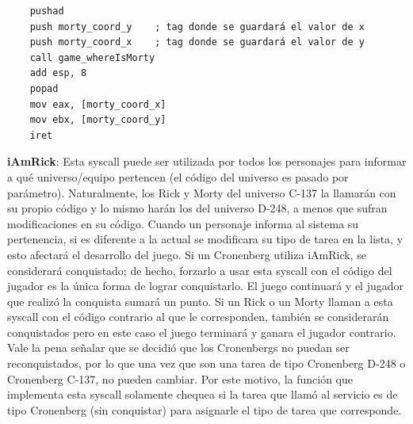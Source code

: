 \documentclass[a4paper]{article}
\newenvironment{codesnippet}{%
	\begin{Sbox}\begin{minipage}{\textwidth}\sffamily\small}%
	{\end{minipage}\end{Sbox}%
		\begin{center}%
		\vspace{-0.4cm}\colorbox{litegrey}{\TheSbox}\end{center}\vspace{0.3cm}}
\begin{document}
\begin{codesnippet}
\begin{verbatim}
    pushad 
    push morty_coord_y    ; tag donde se guardará el valor de x
    push morty_coord_x    ; tag donde se guardará el valor de y
    call game_whereIsMorty
    add esp, 8
    popad
    mov eax, [morty_coord_x]
    mov ebx, [morty_coord_y]
    iret
\end{verbatim}
\end{codesnippet}

\textbf{iAmRick}:
Esta syscall puede ser utilizada por todos los personajes para informar a qué universo/equipo pertencen (el código del universo es pasado por parámetro). Naturalmente, los Rick y Morty del universo C-137 la llamarán con su propio código y lo mismo harán los del universo D-248, a menos que sufran modificaciones en su código. Cuando un personaje informa al sistema su pertenencia, si es diferente a la actual se modificara su tipo de tarea en la lista, y esto afectará el desarrollo del juego. Si un Cronenberg utiliza iAmRick, se considerará conquistado; de hecho, forzarlo a usar esta syscall con el código del jugador es la única forma de lograr conquistarlo. El juego continuará y el jugador que realizó la conquista sumará un punto. Si un Rick o un Morty llaman a esta syscall con el código contrario al que le corresponden, también se considerarán conquistados pero en este caso el juego terminará y ganara el jugador contrario. \\
Vale la pena señalar que se decidió que los Cronenbergs no puedan ser reconquistados, por lo que una vez que son una tarea de tipo Cronenberg D-248 o Cronenberg C-137, no pueden cambiar. Por este motivo, la función que implementa esta syscall solamente chequea si la tarea que llamó al servicio es de tipo Cronenberg (sin conquistar) para asignarle el tipo de tarea que corresponde.
\end{document}
